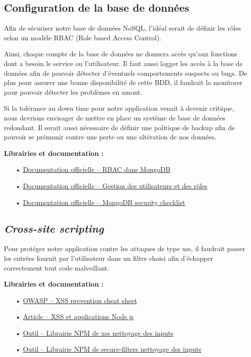 \subsection{Configuration de la base de données}
\label{ssec:cm-configdb}

Afin de sécuriser notre base de données NoSQL, l'idéal serait de définir les rôles selon un modèle RBAC (Role based Access Control).

Ainsi, chaque compte de la base de données ne donnera accès qu'aux fonctions dont a besoin le service ou l'utilisateur. Il faut aussi logger les accès à la base de données afin de pouvoir détecter d'éventuels comportements suspects ou bugs. De plus pour assurer une bonne disponibilité de cette BDD, il faudrait la monitorer pour pouvoir détecter les problèmes en amont.

Si la tolérance au down time pour notre application venait à devenir critique, nous devrions envisager de mettre en place un système de base de données redondant. Il serait aussi nécessaire de définir une politique de backup afin de pouvoir se prémunir contre une perte ou une altération de nos données.

\medskip
\textbf{Librairies et documentation :}

\begin{itemize}
\item[•] \href{https://docs.mongodb.com/manual/core/authorization/}{Documentation officielle -- RBAC dans MongoDB}
\item[•] \href{https://docs.mongodb.com/manual/tutorial/manage-users-and-roles/}{Documentation officielle -- Gestion des utilisateurs et des rôles}
\item[•] \href{https://docs.mongodb.com/manual/administration/security-checklist/}{Documentation officielle -- MongoDB security checklist}
\end{itemize}

\subsection{\emph{Cross-site scripting}}
\label{ssec:cm-xss}

Pour protéger notre application contre les attaques de type xss, il faudrait passer les entrées fournit par l'utilisateur dans un filtre choisi afin d'échapper correctement tout code malveillant.

\medskip
\textbf{Librairies et documentation :}

\begin{itemize}
\item[•] \href{https://www.owasp.org/index.php/XSS_(Cross_Site_Scripting)_Prevention_Cheat_Sheet}{OWASP -- XSS prevention cheat sheet}
\item[•] \href{http://scottksmith.com/blog/2015/06/22/secure-node-apps-against-owasp-top-10-cross-site-scripting/}{Article -- XSS et applications Node.js}
\item[•] \href{https://www.npmjs.com/package/xss}{Outil -- Librairie NPM de xss nettoyage des inputs}
\item[•] \href{https://www.npmjs.com/package/secure-filters}{Outil -- Librairie NPM de secure-filters nettoyage des inputs}
\end{itemize}

